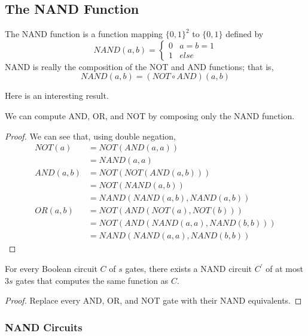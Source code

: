 \documentclass{article}
\begin{document}
  \subsection{The NAND Function}
  \begin{definition}
  The NAND function is a function mapping $\{0,1\}^2$ to $\{0,1\}$ defined by
  \[NAND(a, b) = \begin{cases}
  0 & a = b = 1 \\
  1 & else
  \end{cases}\]
  NAND is really the composition of the NOT and AND functions; that is, 
  \[NAND(a, b) = (NOT \circ AND) (a, b)\]
  \end{definition}

  Here is an interesting result. 

  \begin{theorem}
  We can compute AND, OR, and NOT by composing only the NAND function. 
  \end{theorem}
  \begin{proof}
  We can see that, using double negation, 
  \begin{align*}
      NOT(a) & = NOT(AND(a, a)) \\
      & = NAND(a, a)\\
      AND(a, b) & = NOT(NOT(AND(a, b))) \\
      & = NOT(NAND(a, b)) \\
      & = NAND(NAND(a, b), NAND(a, b)) \\
      OR(a, b) & = NOT(AND(NOT(a), NOT(b))) \\
      & = NOT(AND(NAND(a,a), NAND(b,b))) \\
      & = NAND(NAND(a, a), NAND(b, b)) 
  \end{align*}
  \end{proof}

  \begin{corollary}
  For every Boolean circuit $C$ of $s$ gates, there exists a NAND circuit $C^\prime$ of at most $3s$ gates that computes the same function as $C$. 
  \end{corollary}
  \begin{proof}
  Replace every AND, OR, and NOT gate with their NAND equivalents. 
  \end{proof}

  \subsubsection{NAND Circuits}
\end{document}
